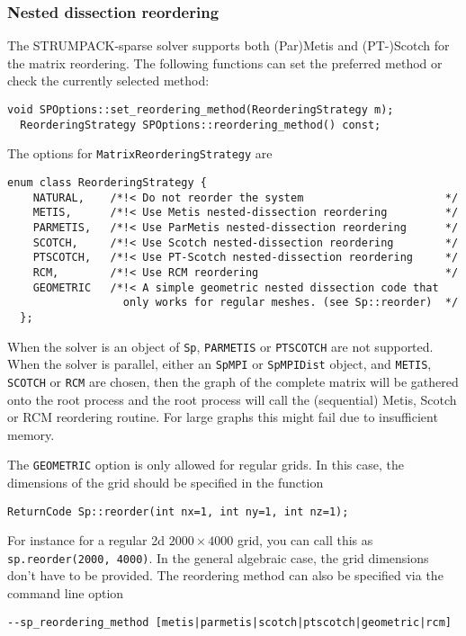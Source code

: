 \documentclass{article}
\begin{document}
\subsubsection{Nested dissection reordering}\label{sec:ND}
The STRUMPACK-sparse solver supports both (Par)Metis and (PT-)Scotch
for the matrix reordering. The following functions can set the
preferred method or check the currently selected method:
\begin{lstlisting}[style=C]
  void SPOptions::set_reordering_method(ReorderingStrategy m);
  ReorderingStrategy SPOptions::reordering_method() const;
\end{lstlisting}
The options for
\lstinline[style=C]!MatrixReorderingStrategy! are
\begin{lstlisting}[style=C]
  enum class ReorderingStrategy {
    NATURAL,    /*!< Do not reorder the system                      */
    METIS,      /*!< Use Metis nested-dissection reordering         */
    PARMETIS,   /*!< Use ParMetis nested-dissection reordering      */
    SCOTCH,     /*!< Use Scotch nested-dissection reordering        */
    PTSCOTCH,   /*!< Use PT-Scotch nested-dissection reordering     */
    RCM,        /*!< Use RCM reordering                             */
    GEOMETRIC   /*!< A simple geometric nested dissection code that
                  only works for regular meshes. (see Sp::reorder)  */
  };
\end{lstlisting}
When the solver is an object of \lstinline[style=C]!Sp!,
\lstinline[style=C]!PARMETIS! or \lstinline[style=C]!PTSCOTCH! are not
supported.  When the solver is parallel, either an
\lstinline[style=C]!SpMPI! or \lstinline[style=C]!SpMPIDist! object,
and \lstinline[style=C]!METIS!, \lstinline[style=C]!SCOTCH! or
\lstinline[style=C]!RCM! are chosen, then the graph of the complete
matrix will be gathered onto the root process and the root process
will call the (sequential) Metis, Scotch or RCM reordering
routine. For large graphs this might fail due to insufficient memory.

The \lstinline[style=C]!GEOMETRIC! option is only allowed for regular
grids. In this case, the dimensions of the grid should be specified in
the function
\begin{lstlisting}[style=C]
  ReturnCode Sp::reorder(int nx=1, int ny=1, int nz=1);
\end{lstlisting}
For instance for a regular 2d $2000 \times 4000$ grid, you can call
this as \lstinline[style=C]!sp.reorder(2000, 4000)!. In the general
algebraic case, the grid dimensions don't have to be provided. The
reordering method can also be specified via the command line option
\begin{lstlisting}[style=Bash]
  --sp_reordering_method [metis|parmetis|scotch|ptscotch|geometric|rcm]
\end{lstlisting}
\end{document}
